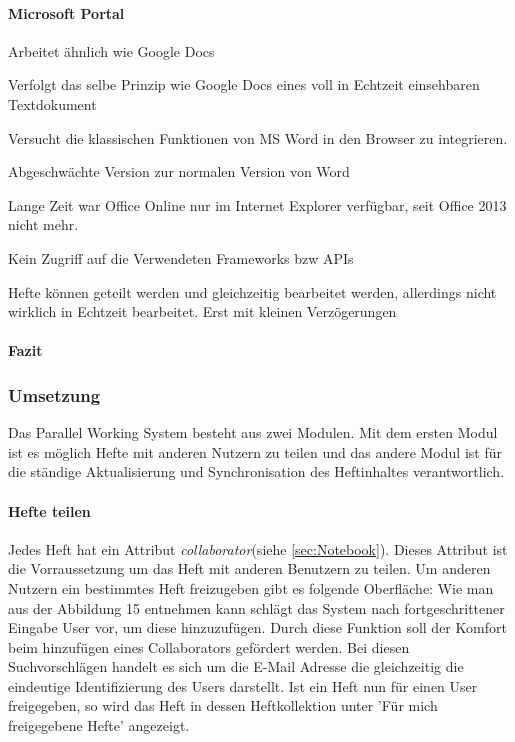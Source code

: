 \paragraph{Microsoft Portal}
Arbeitet ähnlich wie Google Docs

Verfolgt das selbe Prinzip wie Google Docs eines voll in Echtzeit einsehbaren Textdokument

Versucht die klassischen Funktionen von MS Word in den Browser zu integrieren.

Abgeschwächte Version zur normalen Version von Word 

Lange Zeit war Office Online nur im Internet Explorer verfügbar, seit Office 2013 nicht mehr.

Kein Zugriff auf die Verwendeten Frameworks bzw APIs

Hefte können geteilt werden und gleichzeitig bearbeitet werden, allerdings nicht wirklich in Echtzeit bearbeitet. Erst mit kleinen Verzögerungen
\paragraph{Fazit}

\newpage
\subsubsection{Umsetzung}
Das Parallel Working System besteht aus zwei Modulen. Mit dem ersten Modul ist es möglich Hefte mit anderen Nutzern zu teilen und das andere Modul ist für die ständige Aktualisierung und Synchronisation des Heftinhaltes verantwortlich. 
\paragraph{Hefte teilen}
Jedes Heft hat ein Attribut \textit{collaborator}(siehe \ref{sec:Notebook}). Dieses Attribut ist die Vorraussetzung um das Heft mit anderen Benutzern zu teilen. 
Um anderen Nutzern ein bestimmtes Heft freizugeben gibt es folgende Oberfläche:
Wie man aus der Abbildung 15 entnehmen kann schlägt das System nach fortgeschrittener Eingabe User vor, um diese hinzuzufügen. Durch diese Funktion soll der Komfort beim hinzufügen eines Collaborators gefördert werden. Bei diesen Suchvorschlägen handelt es sich um die E-Mail Adresse die gleichzeitig die eindeutige Identifizierung des Users darstellt.
Ist ein Heft nun für einen User freigegeben, so wird das Heft in dessen Heftkollektion unter 'Für mich freigegebene Hefte' angezeigt. \\

